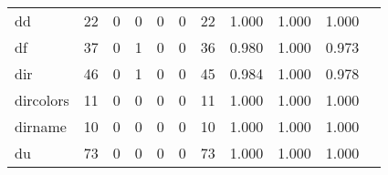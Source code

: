 \begin{longtable}{lp{1.20cm}p{1.20cm}p{1.20cm}p{1.20cm}p{1.20cm}p{1.20cm}p{1.20cm}p{1.20cm}p{1.20cm}p{1.20cm}}
dd        &                                    22 &                                                  0 &                                                  0 &                                                  0 &                                                  0 &                                                 22 &                                         1.000 &                                              1.000 &                                              1.000 \\
df        &                                    37 &                                                  0 &                                                  1 &                                                  0 &                                                  0 &                                                 36 &                                         0.980 &                                              1.000 &                                              0.973 \\
dir       &                                    46 &                                                  0 &                                                  1 &                                                  0 &                                                  0 &                                                 45 &                                         0.984 &                                              1.000 &                                              0.978 \\
dircolors &                                    11 &                                                  0 &                                                  0 &                                                  0 &                                                  0 &                                                 11 &                                         1.000 &                                              1.000 &                                              1.000 \\
dirname   &                                    10 &                                                  0 &                                                  0 &                                                  0 &                                                  0 &                                                 10 &                                         1.000 &                                              1.000 &                                              1.000 \\
du        &                                    73 &                                                  0 &                                                  0 &                                                  0 &                                                  0 &                                                 73 &                                         1.000 &                                              1.000 &                                              1.000 \\

\end{longtable}
